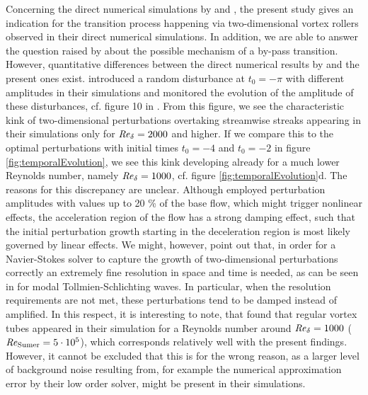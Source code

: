 \documentclass{jfm}
\newcommand\Rey{\mbox{\textit{Re}}}  %
\newcommand\sumer{{\rm Sumer}}
\begin{document}
Concerning the direct numerical simulations by 
\citet{VittoriBlondeaux2008,VittoriBlondeaux2011}
and \citet{OzdemirHsuBalachandar2013}, the present study
gives an indication for
the transition process happening via two-dimensional
vortex rollers observed in their direct numerical simulations. In addition,
we are able to answer the question raised by 
\citet{OzdemirHsuBalachandar2013} about the possible mechanism of 
a by-pass transition. However, quantitative
differences between the direct numerical
results by \citet{OzdemirHsuBalachandar2013} and the present ones
exist. \citet{OzdemirHsuBalachandar2013} introduced
a random disturbance at $ t_0 = - \pi $ with
different amplitudes in their simulations
and monitored the evolution of the amplitude of these disturbances, 
cf. figure 10 in
\citet{OzdemirHsuBalachandar2013}. From this figure, we see the
characteristic kink of two-dimensional perturbations overtaking
streamwise streaks appearing in their simulations
only for $ \Rey_\delta = 2000$
and higher. If we compare this to the optimal perturbations
with initial times $ t_0 = -4 $ and $ t_0 = -2 $ in figure
\ref{fig:temporalEvolution}, we see this kink developing 
already for a much lower Reynolds number,
namely $ \Rey_\delta = 1000 $, cf. figure \ref{fig:temporalEvolution}d.
The reasons for this discrepancy are unclear.
Although \citet{OzdemirHsuBalachandar2013} employed
perturbation amplitudes with values up to 20 \% of the base flow, which
might trigger nonlinear effects, the acceleration region of
the flow has a strong damping effect, such that the initial perturbation
growth starting in the deceleration region is most likely governed by linear effects. 
We might, however,
point out that, in order for a Navier-Stokes solver to
capture the growth of two-dimensional
perturbations correctly an extremely fine resolution in space and
time is needed,
as can be seen in \citet[Appendix A]{VerschaevePedersen2014}
for modal Tollmien-Schlichting waves. In particular, when the
resolution requirements are not met, these perturbations tend to
be damped instead of amplified. In this respect, it is interesting
to note, that \citet{VittoriBlondeaux2008,VittoriBlondeaux2011}
found that regular vortex tubes appeared in their simulation
for a Reynolds number around $ \Rey_\delta = 1000$ ($\Rey_\sumer = 5 \cdot 10^5$),
which corresponds relatively well with the present findings. However,
it cannot be excluded that this is for the wrong reason, as
a larger level of background noise resulting from, for example the
numerical approximation error by their low order solver, might be
present in their simulations.
\end{document}
